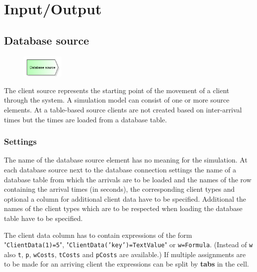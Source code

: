 \chapter{Input/Output}

\renewcommand{\thepage}{\arabic{page}}
\setcounter{page}{1}

\section{Database source}
\label{ref:ModelElementSourceDB}

\begin{figure}
\vspace{-22pt}
\includegraphics[width=2cm]{imageModelElementSourceDB.png}
\vspace{-22pt}
\end{figure}

The client source represents the starting point of the movement of a client through the system.
A simulation model can consist of one or more source elements.
At a table-based source clients are not created based on inter-arrival times but the
times are loaded from a database table.

\subsection*{Settings}

The name of the database source element has no meaning for the simulation.
At each database source next to the database connection settings the
name of a database table from which the arrivals are to be loaded and
the names of the row containing the arrival times (in seconds), the
corresponding client types and optional a column for additional client
data have to be specified. Additional the names of the client types
which are to be respected when loading the database table have to
be specified.

The client data column has to contain expressions of the form 
"\texttt{ClientData(1)=5}", "\texttt{ClientData('key')=TextValue}"
or \texttt{w=Formula}. (Instead of \texttt{w} also \texttt{t}, \texttt{p},
\texttt{wCosts}, \texttt{tCosts} and \texttt{pCosts} are available.)
If multiple assignments are to be made for an arriving client
the expressions can be split by \textbf{tabs} in the cell.


